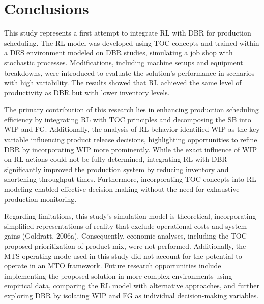 \section{Conclusions}\label{conclusions}

This study represents a first attempt to integrate RL with DBR for
production scheduling. The RL model was developed using TOC concepts and
trained within a DES environment modeled on DBR studies, simulating a
job shop with stochastic processes. Modifications, including machine
setups and equipment breakdowns, were introduced to evaluate the
solution's performance in scenarios with high variability. The results
showed that RL achieved the same level of productivity as DBR but with
lower inventory levels.

The primary contribution of this research lies in enhancing production
scheduling efficiency by integrating RL with TOC principles and
decomposing the SB into WIP and FG. Additionally, the analysis of RL
behavior identified WIP as the key variable influencing product release
decisions, highlighting opportunities to refine DBR by incorporating WIP
more prominently. While the exact influence of WIP on RL actions could
not be fully determined, integrating RL with DBR significantly improved
the production system by reducing inventory and shortening throughput
times. Furthermore, incorporating TOC concepts into RL modeling enabled
effective decision-making without the need for exhaustive production
monitoring.

Regarding limitations, this study's simulation model is theoretical,
incorporating simplified representations of reality that exclude
operational costs and system gains (Goldratt, 2006a). Consequently,
economic analyses, including the TOC-proposed prioritization of product
mix, were not performed. Additionally, the MTS operating mode used in
this study did not account for the potential to operate in an MTO
framework. Future research opportunities include implementing the
proposed solution in more complex environments using empirical data,
comparing the RL model with alternative approaches, and further
exploring DBR by isolating WIP and FG as individual decision-making
variables.

